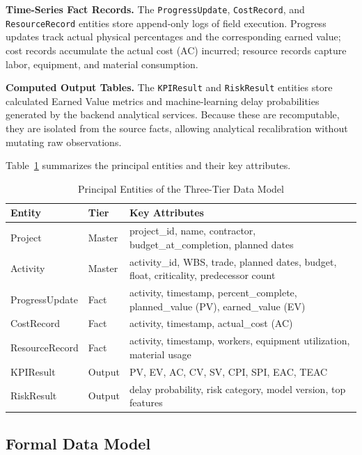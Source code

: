 \documentclass[conference]{IEEEtran}
\begin{document}
\textbf{Time-Series Fact Records.} The \texttt{ProgressUpdate}, \texttt{CostRecord}, and \texttt{ResourceRecord} entities store append-only logs of field execution. Progress updates track actual physical percentages and the corresponding earned value; cost records accumulate the actual cost (AC) incurred; resource records capture labor, equipment, and material consumption.

\textbf{Computed Output Tables.} The \texttt{KPIResult} and \texttt{RiskResult} entities store calculated Earned Value metrics and machine-learning delay probabilities generated by the backend analytical services. Because these are recomputable, they are isolated from the source facts, allowing analytical recalibration without mutating raw observations.

Table~\ref{tab:entities} summarizes the principal entities and their key attributes.

\begin{table}[t]
\caption{Principal Entities of the Three-Tier Data Model}
\label{tab:entities}
\centering
\footnotesize
\begin{tabular}{@{}p{1.35cm}p{0.85cm}p{4.4cm}@{}}
\toprule
\textbf{Entity} & \textbf{Tier} & \textbf{Key Attributes} \\
\midrule
Project & Master & project\_id, name, contractor, budget\_at\_completion, planned dates \\
Activity & Master & activity\_id, WBS, trade, planned dates, budget, float, criticality, predecessor count \\
ProgressUpdate & Fact & activity, timestamp, percent\_complete, planned\_value (PV), earned\_value (EV) \\
CostRecord & Fact & activity, timestamp, actual\_cost (AC) \\
ResourceRecord & Fact & activity, timestamp, workers, equipment utilization, material usage \\
KPIResult & Output & PV, EV, AC, CV, SV, CPI, SPI, EAC, TEAC \\
RiskResult & Output & delay probability, risk category, model version, top features \\
\bottomrule
\end{tabular}
\end{table}

\subsection{Formal Data Model}
\end{document}
